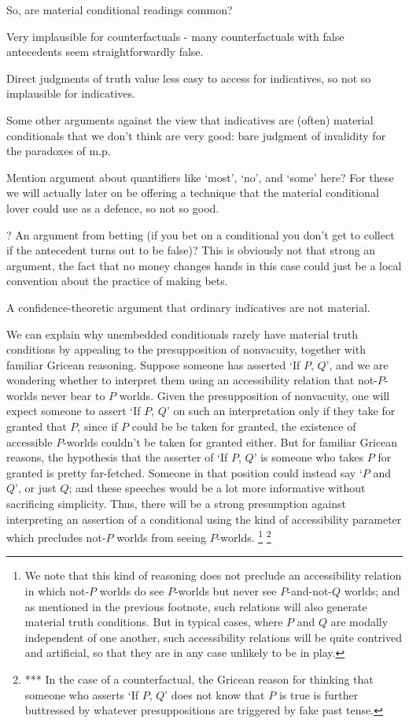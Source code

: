 \documentclass[If.tex]{subfiles}
\begin{document}
\begin{prop}
So, are material conditional readings common?  
\begin{prop}
	\item
	Very implausible for counterfactuals - many counterfactuals with false antecedents seem straightforwardly false.  
	\item
	Direct judgments of truth value less easy to access for indicatives, so not so implausible for indicatives.  
	\item
	Some other arguments against the view that indicatives are (often) material conditionals that we don't think are very good: bare judgment of invalidity for the paradoxes of m.p.  
	\item
	Mention argument about quantifiers like ‘most’, ‘no’, and ‘some’ here?  For these we will actually later on be offering a technique that the material conditional lover could use as a defence, so not so good.  
	\item
	? An argument from betting (if you bet on a conditional you don't get to collect if the antecedent turns out to be false)?  This is obviously not that strong an argument, the fact that no money changes hands in this case could just be a local convention about the practice of making bets.  
	\item
	A confidence-theoretic argument that ordinary indicatives are not material.  
\end{prop}

We can explain why unembedded conditionals rarely have material truth conditions by appealing to the presupposition of nonvacuity, together with familiar Gricean reasoning.  Suppose someone has asserted ‘If $P$, $Q$’, and we are wondering whether to interpret them using an accessibility relation that not-$P$-worlds never bear to $P$ worlds.  Given the presupposition of nonvacuity, one will expect someone to assert ‘If $P$, $Q$’ on such an interpretation only if they take for granted that $P$, since if $P$ could be be taken for granted, the existence of accessible $P$-worlds couldn't be taken for granted either.  But for familiar Gricean reasons, the hypothesis that the asserter of ‘If $P$, $Q$’ is someone who takes $P$ for granted is pretty far-fetched.  Someone in that position could instead say ‘$P$ and $Q$’, or just $Q$; and these speeches would be a lot more informative without sacrificing simplicity.  Thus, there will be a strong presumption against interpreting an assertion of a conditional using the kind of accessibility parameter which precludes not-$P$ worlds from seeing $P$-worlds.%
\footnote{We note that this kind of reasoning does not preclude an accessibility relation in which not-$P$ worlds do see $P$-worlds but never see $P$-and-not-$Q$ worlds; and as mentioned in the previous footnote, such relations will also generate material truth conditions.  But in typical cases, where $P$ and $Q$ are modally independent of one another, such accessibility relations will be quite contrived and artificial, so that they are in any case unlikely to be in play.}  %
\footnote{*** In the case of a counterfactual, the Gricean reason for thinking that someone who asserts ‘If $P$, $Q$’ does not know that $P$ is true is further buttressed by whatever presuppositions are triggered by fake past tense.}


\end{prop}
\end{document}
